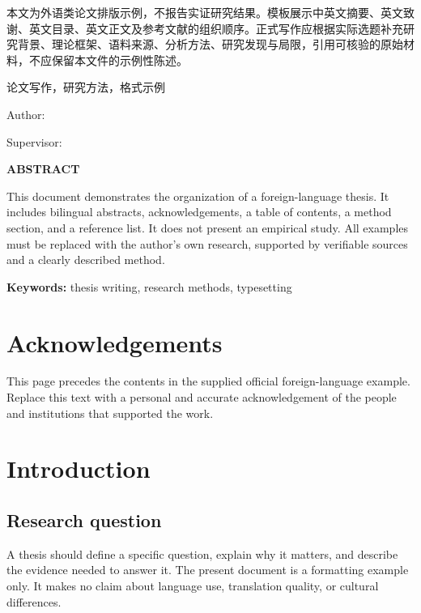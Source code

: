 \pagestyle{hntfront}
\begin{center}{\hei{}\hnttitle}\par{}\end{center}
本文为外语类论文排版示例，不报告实证研究结果。模板展示中英文摘要、英文致谢、英文目录、英文正文及参考文献的组织顺序。正式写作应根据实际选题补充研究背景、理论框架、语料来源、分析方法、研究发现与局限，引用可核验的原始材料，不应保留本文件的示例性陈述。
\par\medskip{}论文写作，研究方法，格式示例
\clearpage
\begin{center}{\rmfamily\bfseries{}\hnttitleeng}\par\medskip
Author: \hntauthoreng\par Supervisor: \hntadvisoreng\par\medskip
{\bfseries{}ABSTRACT}\end{center}
This document demonstrates the organization of a foreign-language thesis. It includes bilingual abstracts, acknowledgements, a table of contents, a method section, and a reference list. It does not present an empirical study. All examples must be replaced with the author's own research, supported by verifiable sources and a clearly described method.
\par\medskip\noindent\textbf{Keywords:} thesis writing, research methods, typesetting
\clearpage\section*{Acknowledgements}
This page precedes the contents in the supplied official foreign-language example. Replace this text with a personal and accurate acknowledgement of the people and institutions that supported the work.
\clearpage
\renewcommand{\contentsname}{CONTENTS}
\renewcommand{\cfttoctitlefont}{\hfill\rmfamily\bfseries\zihao{2}}
\renewcommand{\cftsecfont}{\rmfamily\bfseries\zihao{4}}
\renewcommand{\cftsubsecfont}{\rmfamily\zihao{-4}}
\renewcommand{\cftsubsubsecfont}{\rmfamily\zihao{-4}}
\renewcommand{\cftdotsep}{4.5}
\tableofcontents
\clearpage{}\pagestyle{hntmain}
\section{Introduction}
\subsection{Research question}
A thesis should define a specific question, explain why it matters, and describe the evidence needed to answer it. The present document is a formatting example only. It makes no claim about language use, translation quality, or cultural differences.
